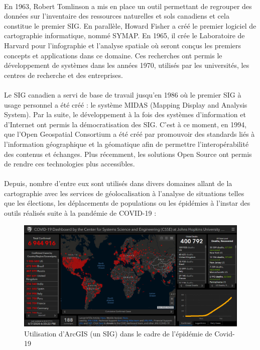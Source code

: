 \paragraph{}En 1963, Robert Tomlinson \supercite{tomlinson} a mis en place un outil permettant de regrouper des données sur l’inventaire des ressources naturelles et sols canadiens et cela constitue le premier \acrshort{SIG}. En parallèle, Howard Fisher a créé le premier logiciel de cartographie informatique, nommé SYMAP. En 1965, il crée le Laboratoire de Harvard pour l'infographie et l'analyse spatiale où seront conçus les premiers concepts et applications dans ce domaine. Ces recherches ont permis le développement de systèmes dans les années 1970, utilisés par les universités, les centres de recherche et des entreprises.

\paragraph{}Le \acrshort{SIG} canadien a servi de base de travail jusqu’en 1986 où le premier \acrshort{SIG} à usage personnel a été créé : le système MIDAS (Mapping Display and Analysis System). Par la suite, le développement à la fois des systèmes d’information et d’Internet ont permis la démocratisation des \acrshort{SIG}. C’est à ce moment, en 1994, que l’Open Geospatial Consortium a été créé par promouvoir des standards liés à l’information géographique et la géomatique afin de permettre l’interopérabilité des contenus et échanges. Plus récemment, les solutions Open Source ont permis de rendre ces technologies plus accessibles.

\paragraph{}Depuis, nombre d'entre eux sont utilisés dans divers domaines allant de la cartographie avec les services de géolocalisation à l'analyse de situations telles que les élections, les déplacements de populations ou les épidémies à l'instar des outils réalisés suite à la pandémie de COVID-19 :
\begin{figure}[htp]
  \centering
  \includegraphics[width=120mm]{src_img/gis_use_example.png}
  \caption{Utilisation d'ArcGIS (un \acrshort{SIG}) dans le cadre de l'épidémie de Covid-19\supercite{arcgisCovid}}
  \label{fig:arcgisexemple}
\end{figure}


